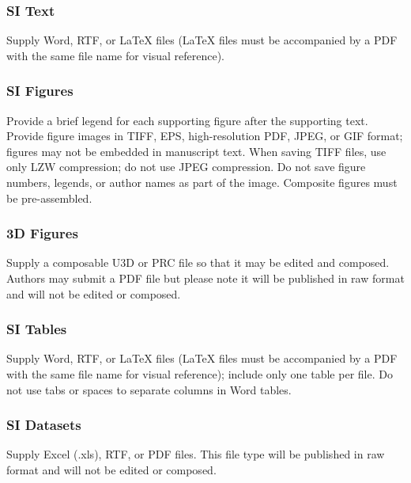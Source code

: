 \documentclass[9pt,twocolumn,twoside,]{pnas-new}
\begin{document}
\subsubsection*{SI Text}\label{si-text}

Supply Word, RTF, or LaTeX files (LaTeX files must be accompanied by a
PDF with the same file name for visual reference).

\subsubsection*{SI Figures}\label{si-figures}

Provide a brief legend for each supporting figure after the supporting
text. Provide figure images in TIFF, EPS, high-resolution PDF, JPEG, or
GIF format; figures may not be embedded in manuscript text. When saving
TIFF files, use only LZW compression; do not use JPEG compression. Do
not save figure numbers, legends, or author names as part of the image.
Composite figures must be pre-assembled.

\subsubsection*{3D Figures}\label{d-figures}

Supply a composable U3D or PRC file so that it may be edited and
composed. Authors may submit a PDF file but please note it will be
published in raw format and will not be edited or composed.

\subsubsection*{SI Tables}\label{si-tables}

Supply Word, RTF, or LaTeX files (LaTeX files must be accompanied by a
PDF with the same file name for visual reference); include only one
table per file. Do not use tabs or spaces to separate columns in Word
tables.

\subsubsection*{SI Datasets}\label{si-datasets}

Supply Excel (.xls), RTF, or PDF files. This file type will be published
in raw format and will not be edited or composed.
\end{document}
